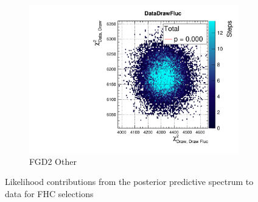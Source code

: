 \begin{figure}[h]
\begin{subfigure}[t]{0.32\textwidth}
		\includegraphics[width=\textwidth, trim={20mm 6mm 4mm 11mm}, clip,page=52]{figures/mach3/2018/data/2018a_FixedCov_RedCov_Mpi_Data_merge_PostPredStore_FullLLH_procs}
		\caption{FGD2 Other}
	\end{subfigure}
	\caption{Likelihood contributions from the posterior predictive spectrum to data for FHC selections}
	\label{fig:posterior_pred_data_fhc_2018}
\end{figure}

